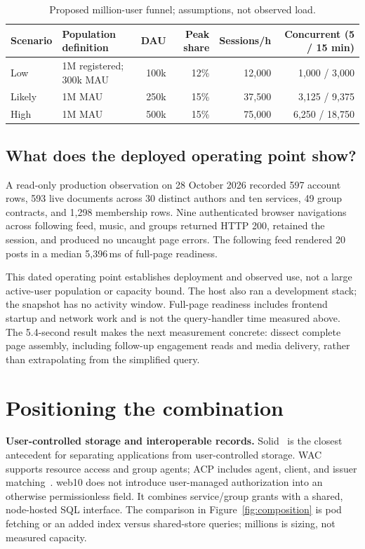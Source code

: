 \documentclass[sigconf, nonacm]{acmart}
\begin{document}
\begin{table}[t]
\centering
\caption{Proposed million-user funnel; assumptions, not observed load.}
\label{tab:funnel}
\begin{tabular}{llrrrr}
\toprule
Scenario & Population definition & DAU & Peak share & Sessions/h & Concurrent (5 / 15 min) \\
\midrule
Low & 1M registered; 300k MAU & 100k & 12\% & 12,000 & 1,000 / 3,000 \\
Likely & 1M MAU & 250k & 15\% & 37,500 & 3,125 / 9,375 \\
High & 1M MAU & 500k & 15\% & 75,000 & 6,250 / 18,750 \\
\bottomrule
\end{tabular}
\end{table}

\subsection{What does the deployed operating point show?}
\label{sec:ev-production}

A read-only production observation on 28 October 2026 recorded 597
account rows, 593 live documents across 30 distinct authors and ten
services, 49 group contracts, and 1,298 membership rows. Nine
authenticated browser navigations across following feed, music, and
groups returned HTTP 200, retained the session, and produced no uncaught
page errors. The following feed rendered 20 posts in a median 5,396\,ms
of full-page readiness.

This dated operating point establishes deployment and observed use,
not a large active-user population or capacity bound. The host also ran
a development stack; the snapshot has no activity window. Full-page
readiness includes frontend startup and network work and is not the
query-handler time measured above. The 5.4-second result makes the next
measurement concrete: dissect complete page assembly, including
follow-up engagement reads and media delivery, rather than extrapolating
from the simplified query.

\section{Positioning the combination}
\label{sec:related}

\textbf{User-controlled storage and interoperable records.}
Solid~\cite{solid2016,solid-apps2016,css2024} is the closest antecedent
for separating applications from user-controlled storage. WAC supports
resource access and group agents; ACP includes agent, client, and issuer
matching~\cite{wac2022,acp2022}. web10 does not introduce user-managed
authorization into an otherwise permissionless field. It combines
service/group grants with a shared, node-hosted SQL interface. The
comparison in Figure~\ref{fig:composition} is pod fetching or an added
index versus shared-store queries; millions is sizing, not measured capacity.
\end{document}
